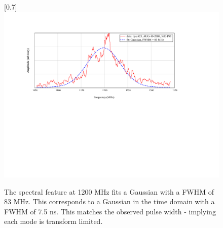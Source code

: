 \begin{figure}
\scalebox{0.7}[0.7]{
\includegraphics*[bb=75 286 643 540]
{fit/fit.pdf}
}
\caption[Gaussinan fit for a single RF beat spectral feature]{The spectral feature at 1200 MHz fits a Gaussian with a FWHM of 83 MHz. This corresponds to a Gaussian in the time domain with a FWHM of 7.5 ns. This matches the observed pulse width - implying each mode is transform limited.}
\label{fit}
\end{figure}
